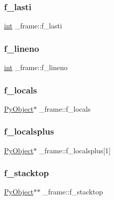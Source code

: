 \subsubsection{\texorpdfstring{f\_lasti}{f\_lasti}}
{\footnotesize\ttfamily \mbox{\hyperlink{warnings_8h_a74f207b5aa4ba51c3a2ad59b219a423b}{int}} \+\_\+frame\+::f\+\_\+lasti}

\mbox{\label{struct__frame_a584b2ea31653920d828df650b8223d11}} 
\subsubsection{\texorpdfstring{f\_lineno}{f\_lineno}}
{\footnotesize\ttfamily \mbox{\hyperlink{warnings_8h_a74f207b5aa4ba51c3a2ad59b219a423b}{int}} \+\_\+frame\+::f\+\_\+lineno}

\mbox{\label{struct__frame_a723e1f7f21d8fd1bbf93dcad47e62f74}} 
\subsubsection{\texorpdfstring{f\_locals}{f\_locals}}
{\footnotesize\ttfamily \mbox{\hyperlink{_python27_2object_8h_aadc84ac7aed2cfa6f20c25f62bf3dac7}{Py\+Object}}$\ast$ \+\_\+frame\+::f\+\_\+locals}

\mbox{\label{struct__frame_a0c11cca41571107e3c56771eb385a146}} 
\subsubsection{\texorpdfstring{f\_localsplus}{f\_localsplus}}
{\footnotesize\ttfamily \mbox{\hyperlink{_python27_2object_8h_aadc84ac7aed2cfa6f20c25f62bf3dac7}{Py\+Object}}$\ast$ \+\_\+frame\+::f\+\_\+localsplus\mbox{[}1\mbox{]}}

\mbox{\label{struct__frame_a57757e28548379cb1a3e6e82062a9fe5}} 
\subsubsection{\texorpdfstring{f\_stacktop}{f\_stacktop}}
{\footnotesize\ttfamily \mbox{\hyperlink{_python27_2object_8h_aadc84ac7aed2cfa6f20c25f62bf3dac7}{Py\+Object}}$\ast$$\ast$ \+\_\+frame\+::f\+\_\+stacktop}

